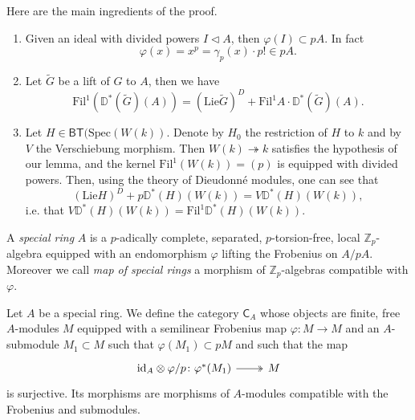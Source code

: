 \begin{rem}[]\label{rem:A2Kisin}
	Here are the main ingredients of the proof.
\begin{enumerate}
	\item Given an ideal with divided powers $I \triangleleft A$, then $\varphi(I) \subset pA$.
		In fact 
		\begin{equation*}
			\varphi(x) = x^p = \gamma_p(x) \cdot p! \in pA
		.\end{equation*}

	\item Let $\widetilde{G}$ be a lift of $G$ to $A$, then we have
		\begin{equation*}
			\mathrm{Fil}^1(\mathbb{D}^*(\widetilde{G})(A)) =
			( \mathrm{Lie} \widetilde{G} )^D +
			\mathrm{Fil}^1A \cdot \mathbb{D}^*(\widetilde{G})(A)
		.\end{equation*}
		
	\item Let $H \in \mathsf{BT}(\mathrm{Spec}(W(k))$. Denote by $H_0$ the restriction
		of $H$ to $k$ and by $V$ the Verschiebung morphism.
		Then $W(k) \twoheadrightarrow k$ satisfies the hypothesis of our lemma,
		and the kernel $\mathrm{Fil}^1(W(k)) = (p)$ is equipped with divided powers.
		Then, using the theory of Dieudonné modules, one can see that
		\begin{equation*}
			( \mathrm{Lie} H)^D + p \mathbb{D}^*(H)(W(k)) =
			V \mathbb{D}^{*}(H)(W(k))
		,\end{equation*}
		i.e. that
		$V \mathbb{D}^*(H)(W(k)) = \mathrm{Fil}^1 \mathbb{D}^*(H)(W(k))$.
\end{enumerate}
\end{rem}


\begin{defn}
	A {\em special ring} $A$ is a $p$-adically complete, separated, $p$-torsion-free,
	local $\mathbb{Z}_{p}$-algebra equipped with an endomorphism $\varphi$
	lifting the Frobenius on $A/pA$.
	Moreover we call {\em map of special rings} a morphism
	of $\mathbb{Z}_{p}$-algebras compatible with $\varphi$.
\end{defn}


\begin{defn}[]
	Let $A$ be a special ring. We define the category
	$\mathsf{C}_A$ whose objects are finite, free $A$-modules
	$M$ equipped with a semilinear Frobenius map $\varphi\colon M \to M$
	and an $A$-submodule $M_1 \subset M$ such that $\varphi(M_1) \subset pM$
	and such that the map
	\begin{equation*}
	\begin{tikzcd}[row sep = 0ex
		,/tikz/column 1/.append style={anchor=base east}
		,/tikz/column 2/.append style={anchor=base west}]
		\mathrm{id}_{ A }\otimes\varphi/p\colon 
		\varphi^*(M_1) \arrow[r, "", twoheadrightarrow] &
		M
	\end{tikzcd}
	\end{equation*} 
	is surjective.
	Its morphisms are morphisms of $A$-modules compatible with
	the Frobenius and submodules.
\end{defn}


